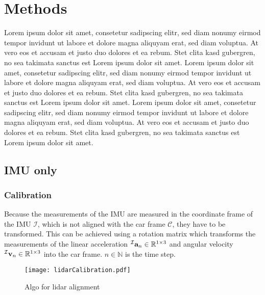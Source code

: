 \chapter{Methods}
\label{ch:Methods}
Lorem ipsum dolor sit amet, consetetur sadipscing elitr, sed diam nonumy eirmod tempor invidunt ut labore et dolore magna aliquyam erat, sed diam voluptua.
At vero eos et accusam et justo duo dolores et ea rebum. Stet clita kasd gubergren, no sea takimata sanctus est Lorem ipsum dolor sit amet.
Lorem ipsum dolor sit amet, consetetur sadipscing elitr, sed diam nonumy eirmod tempor invidunt ut labore et dolore magna aliquyam erat, sed diam voluptua.
At vero eos et accusam et justo duo dolores et ea rebum. Stet clita kasd gubergren, no sea takimata sanctus est Lorem ipsum dolor sit amet.
Lorem ipsum dolor sit amet, consetetur sadipscing elitr, sed diam nonumy eirmod tempor invidunt ut labore et dolore magna aliquyam erat, sed diam voluptua.
At vero eos et accusam et justo duo dolores et ea rebum. Stet clita kasd gubergren, no sea takimata sanctus est Lorem ipsum dolor sit amet.

\section{IMU only}
\subsection{Calibration}
Because the measurements of the IMU are measured in the coordinate frame of the IMU $\mathcal{I}$, which is not aligned with the car frame $\mathcal{C}$, they have to be transformed.
This can be achieved using a rotation matrix  which transforms the measurements of the linear acceleration $\vincs{a}{I}_n \in \mathbb{R}^{1\times3}$ and angular velocity ${\vincs{v}{I}_n \in \mathbb{R}^{1\times3}}$ into the car frame. $n \in \mathbb{N}$ is the time step.

\begin{figure}[htb]
	\centering
	\texttt{[image: lidarCalibration.pdf]}
	\caption{Algo for lidar alignment}
	\label{fig:lidarCalibration}
\end{figure}

